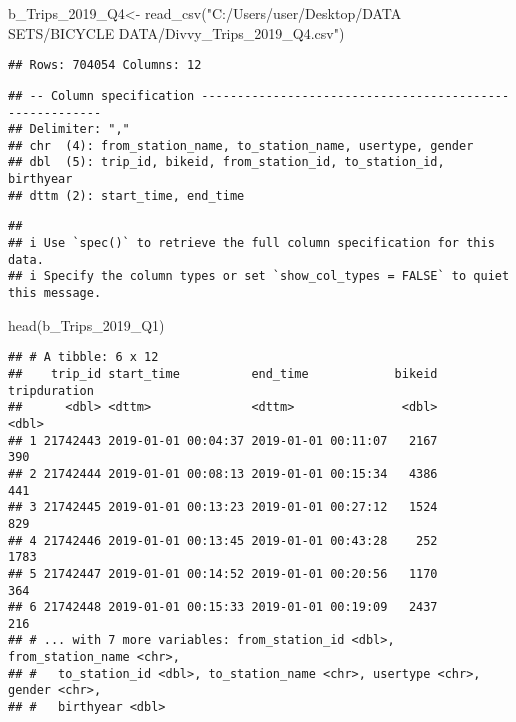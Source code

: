 \documentclass[
]{article}
\newenvironment{Shaded}{\begin{snugshade}}{\end{snugshade}}
\newcommand{\FunctionTok}[1]{\textcolor[rgb]{0.00,0.00,0.00}{#1}}
\newcommand{\NormalTok}[1]{#1}
\newcommand{\OtherTok}[1]{\textcolor[rgb]{0.56,0.35,0.01}{#1}}
\newcommand{\StringTok}[1]{\textcolor[rgb]{0.31,0.60,0.02}{#1}}
\begin{document}
\begin{Shaded}
\begin{Highlighting}[]
\NormalTok{b\_Trips\_2019\_Q4}\OtherTok{\textless{}{-}} \FunctionTok{read\_csv}\NormalTok{(}\StringTok{"C:/Users/user/Desktop/DATA SETS/BICYCLE DATA/Divvy\_Trips\_2019\_Q4.csv"}\NormalTok{)}
\end{Highlighting}
\end{Shaded}

\begin{verbatim}
## Rows: 704054 Columns: 12
\end{verbatim}

\begin{verbatim}
## -- Column specification --------------------------------------------------------
## Delimiter: ","
## chr  (4): from_station_name, to_station_name, usertype, gender
## dbl  (5): trip_id, bikeid, from_station_id, to_station_id, birthyear
## dttm (2): start_time, end_time
\end{verbatim}

\begin{verbatim}
## 
## i Use `spec()` to retrieve the full column specification for this data.
## i Specify the column types or set `show_col_types = FALSE` to quiet this message.
\end{verbatim}

\begin{Shaded}
\begin{Highlighting}[]
\FunctionTok{head}\NormalTok{(b\_Trips\_2019\_Q1)}
\end{Highlighting}
\end{Shaded}

\begin{verbatim}
## # A tibble: 6 x 12
##    trip_id start_time          end_time            bikeid tripduration
##      <dbl> <dttm>              <dttm>               <dbl>        <dbl>
## 1 21742443 2019-01-01 00:04:37 2019-01-01 00:11:07   2167          390
## 2 21742444 2019-01-01 00:08:13 2019-01-01 00:15:34   4386          441
## 3 21742445 2019-01-01 00:13:23 2019-01-01 00:27:12   1524          829
## 4 21742446 2019-01-01 00:13:45 2019-01-01 00:43:28    252         1783
## 5 21742447 2019-01-01 00:14:52 2019-01-01 00:20:56   1170          364
## 6 21742448 2019-01-01 00:15:33 2019-01-01 00:19:09   2437          216
## # ... with 7 more variables: from_station_id <dbl>, from_station_name <chr>,
## #   to_station_id <dbl>, to_station_name <chr>, usertype <chr>, gender <chr>,
## #   birthyear <dbl>
\end{verbatim}
\end{document}
